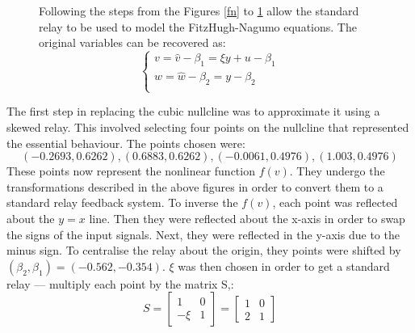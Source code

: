 \documentclass[a4paper, 12pt]{article}
\begin{document}
\begin{appendices}
\begin{figure}[h!]
\begin{minipage}[t]{.4\textwidth}
\begin{tikzpicture}[auto, node distance=2cm,>=latex]
\end{tikzpicture}
\label{fn_final_block}
\end{minipage}
\hspace{0.5cm}
\begin{minipage}[t]{.4\textwidth}\vspace{-2cm}\small
Following the steps from the Figures \ref{fn} to \ref{fn_final_block} allow the standard relay to be used to model the FitzHugh-Nagumo equations. The original variables can be recovered as: 
\begin{equation*}
\begin{cases}
v = \hat{v}-\beta_1 = \xi y + u - \beta_1 \\
w = \hat{w}-\beta_2 = y - \beta_2 \\
\end{cases}
\end{equation*}
\end{minipage}
\end{figure}


\newpage
The first step in replacing the cubic nullcline was to approximate it using a skewed relay. This involved selecting four points on the nullcline that represented the essential behaviour. The points chosen were: 
\begin{equation}
(-0.2693,0.6262),(0.6883,0.6262),(-0.0061,0.4976),(1.003,0.4976)
\end{equation}
These points now represent the nonlinear function $f(v)$. They undergo the transformations described in the above figures in order to convert them to a standard relay feedback system. To inverse the $f(v)$, each point was reflected about the $y=x$ line. Then they were reflected about the x-axis in order to swap the signs of the input signals. Next, they were reflected in the y-axis due to the minus sign. To centralise the relay about the origin, they points were shifted by $(\beta_2,\beta_1) = (-0.562,-0.354)$. $\xi$ was then chosen in order to get a standard relay --- multiply each point by the matrix S,:
\begin{equation}
S = \begin{bmatrix}
1 & 0 \\ -\xi & 1 
\end{bmatrix}  = \begin{bmatrix}
1 & 0 \\ 2 & 1 
\end{bmatrix}
\end{equation}  


\end{appendices}
\end{document}
